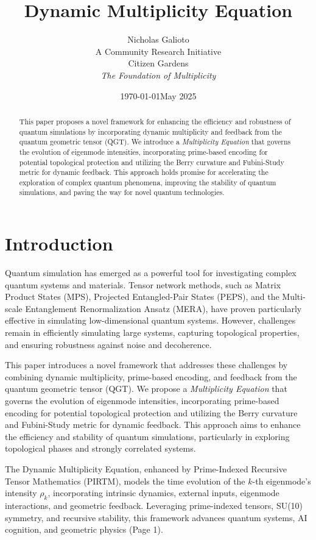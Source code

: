 \documentclass{article}
\title{Dynamic Multiplicity Equation}
\author{Nicholas Galioto \\ A Community Research Initiative\\ Citizen Gardens \\ \textit{The Foundation of Multiplicity}}
\date{\today}
\date{May 2025}
\theoremstyle{plain}
\theoremstyle{definition}
\begin{document}
    
\maketitle
\begin{abstract}

This paper proposes a novel framework for enhancing the efficiency and robustness of quantum simulations by incorporating dynamic multiplicity and feedback from the quantum geometric tensor (QGT). We introduce a \textit{Multiplicity Equation} that governs the evolution of eigenmode intensities, incorporating prime-based encoding for potential topological protection and utilizing the Berry curvature and Fubini-Study metric for dynamic feedback. This approach holds promise for accelerating the exploration of complex quantum phenomena, improving the stability of quantum simulations, and paving the way for novel quantum technologies.
    
\end{abstract}
\section{Introduction}
Quantum simulation has emerged as a powerful tool for investigating complex quantum systems and materials. Tensor network methods, such as Matrix Product States (MPS), Projected Entangled-Pair States (PEPS), and the Multi-scale Entanglement Renormalization Ansatz (MERA), have proven particularly effective in simulating low-dimensional quantum systems. However, challenges remain in efficiently simulating large systems, capturing topological properties, and ensuring robustness against noise and decoherence.

This paper introduces a novel framework that addresses these challenges by combining dynamic multiplicity, prime-based encoding, and feedback from the quantum geometric tensor (QGT). We propose a \textit{Multiplicity Equation} that governs the evolution of eigenmode intensities, incorporating prime-based encoding for potential topological protection and utilizing the Berry curvature and Fubini-Study metric for dynamic feedback. This approach aims to enhance the efficiency and stability of quantum simulations, particularly in exploring topological phases and strongly correlated systems.

The Dynamic Multiplicity Equation, enhanced by Prime-Indexed Recursive Tensor Mathematics (PIRTM), models the time evolution of the \( k \)-th eigenmode’s intensity \( \rho_k \), incorporating intrinsic dynamics, external inputs, eigenmode interactions, and geometric feedback. Leveraging prime-indexed tensors, SU(10) symmetry, and recursive stability, this framework advances quantum systems, AI cognition, and geometric physics (Page 1).
\end{document}

